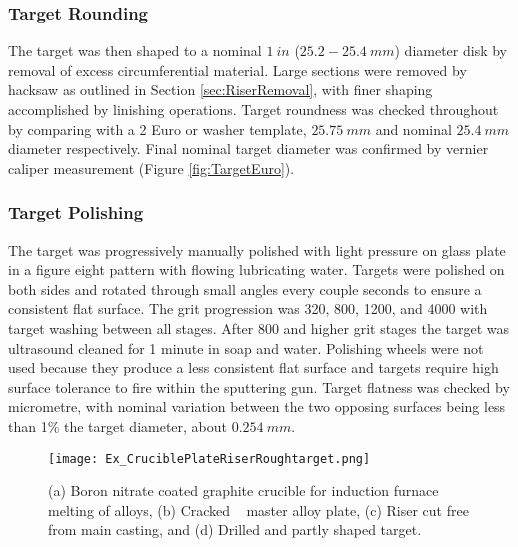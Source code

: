 \documentclass[a4paper,12pt,oneside]{report}%
\begin{document}
\subsubsection{Target Rounding}
The target was then shaped to a nominal $1~ in$ ($25.2 - 25.4~ mm$) diameter disk by removal of excess circumferential material. Large sections were removed by hacksaw as outlined in Section \ref{sec:RiserRemoval}, with finer shaping accomplished by linishing operations. Target roundness was checked throughout by comparing with a 2 Euro or washer template, $25.75~ mm$ and nominal $25.4~ mm$ diameter respectively. Final nominal target diameter was confirmed by vernier caliper measurement (Figure \ref{fig:TargetEuro}).  

\subsubsection{Target Polishing}
The target was progressively manually polished with light pressure on glass plate in a figure eight pattern with flowing lubricating water. Targets were polished on both sides and rotated through small angles every couple seconds to ensure a consistent flat surface. The grit progression was 320, 800, 1200, and 4000 with target washing between all stages. After 800 and higher grit stages the target was ultrasound cleaned for 1 minute in soap and water. Polishing wheels were not used because they produce a less consistent flat surface and targets require high surface tolerance to fire within the sputtering gun. Target flatness was checked by micrometre, with nominal variation between the two opposing surfaces being less than 1\% the target diameter, about $0.254~ mm$. 

\begin{figure}[htbp]
	\centering
	\texttt{[image: Ex\_CruciblePlateRiserRoughtarget.png]}
	\caption{(a) Boron nitrate coated graphite crucible for induction furnace melting of alloys, (b) Cracked \MgZnCa~ master alloy plate, (c) Riser cut free from main casting, and (d) Drilled and partly shaped target.}
	\label{fig:CrucibleShaping}
\end{figure}
\end{document}

